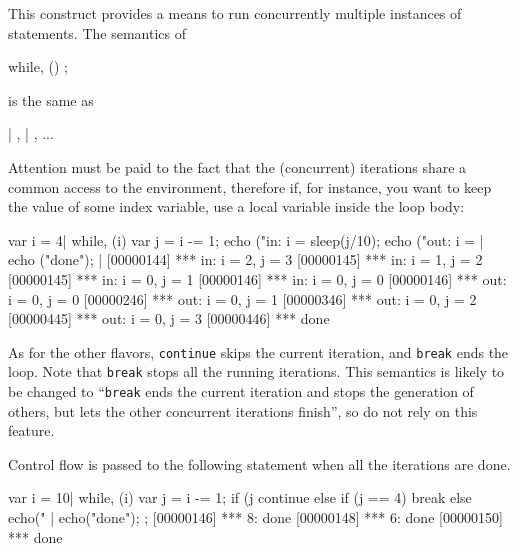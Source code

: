 This construct provides a means to run concurrently multiple instances
of statements.  The semantics of

\begin{urbiunchecked}
while, ()
  ;
\end{urbiunchecked}

\noindent
is the same as

\begin{urbiunchecked}
 |  ,  |  , ...
\end{urbiunchecked}

Attention must be paid to the fact that the (concurrent) iterations
share a common access to the environment, therefore if, for instance,
you want to keep the value of some index variable, use a local
variable inside the loop body:

\begin{urbiscript}[firstnumber=1]
{
  var i = 4|
  while, (i)
  {
    var j = i -= 1;
    echo ("in: i = %
    sleep(j/10);
    echo ("out: i = %
  }|
  echo ("done");
}|
[00000144] *** in: i = 2, j = 3
[00000145] *** in: i = 1, j = 2
[00000145] *** in: i = 0, j = 1
[00000146] *** in: i = 0, j = 0
[00000146] *** out: i = 0, j = 0
[00000246] *** out: i = 0, j = 1
[00000346] *** out: i = 0, j = 2
[00000445] *** out: i = 0, j = 3
[00000446] *** done
\end{urbiscript}

As for the other flavors, \lstinline|continue| skips the current
iteration, and \lstinline|break| ends the loop.  Note that
\lstinline|break| stops all the running iterations.  This semantics is
likely to be changed to ``\lstinline|break| ends the current iteration
and stops the generation of others, but lets the other concurrent
iterations finish'', so do not rely on this feature.

Control flow is passed to the following statement when all the
iterations are done.

\begin{urbiscript}
{
  var i = 10|
  while, (i)
  {
    var j = i -= 1;
    if (j %
      continue
    else if (j == 4)
      break
    else
      echo("%
  }|
  echo("done");
};
[00000146] *** 8: done
[00000148] *** 6: done
[00000150] *** done
\end{urbiscript}



